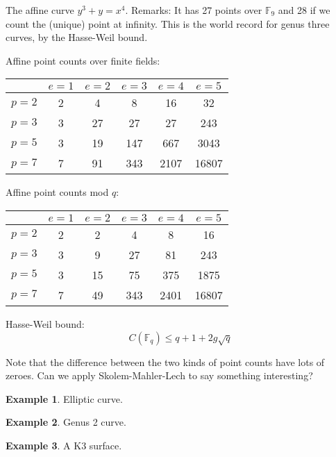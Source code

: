\documentclass[a4paper]{article}
\theoremstyle{definition}
\newtheorem{example}{Example}[section]
\theoremstyle{remark}
\newcommand{\Fq}{\mathbb{F}_q}
\begin{document}
The affine curve $y^3 + y = x^4$. Remarks: It has 27 points over $\mathbb{F}_9$ and 28 if we count the (unique) point at infinity. This is the world record for genus three curves, by the Hasse-Weil bound. 

Affine point counts over finite fields:
\begin{table}[h]
\centering
\begin{tabular}{| l | | c | c | c | c | c |}
\hline
& $e = 1$ & $e = 2$ & $e = 3$ & $e = 4$ & $e = 5$\\
\hline
\hline
$p = 2$ & 2 & 4 & 8 & 16 & 32 \\
\hline
$p = 3$ & 3 & 27 & 27 & 27 & 243 \\
\hline
$p = 5$ & 3 & 19 & 147 & 667 & 3043 \\
\hline
$p = 7$ & 7 & 91 & 343 & 2107 & 16807 \\
\hline
\end{tabular}
\end{table}

Affine point counts mod $q$:
\begin{table}[h]
\centering
\begin{tabular}{| l | | c | c | c | c | c |}
\hline
& $e = 1$ & $e = 2$ & $e = 3$ & $e = 4$ & $e = 5$\\
\hline
\hline
$p = 2$ & 2 & 2 & 4 & 8 & 16 \\
\hline
$p = 3$ & 3 & 9 & 27 & 81 & 243 \\
\hline
$p = 5$ & 3 & 15 & 75 & 375 & 1875 \\
\hline
$p = 7$ & 7 & 49 & 343 & 2401 & 16807 \\
\hline
\end{tabular}
\end{table}

Hasse-Weil bound: 
$$ C(\Fq) \leq q + 1 + 2 g \sqrt{q}  $$

Note that the difference between the two kinds of point counts have lots of zeroes. Can we apply Skolem-Mahler-Lech to say something interesting?
\begin{example}
Elliptic curve.

\end{example}


\begin{example}
Genus 2 curve.

\end{example}


\begin{example}
A K3 surface.

\end{example}
\end{document}
